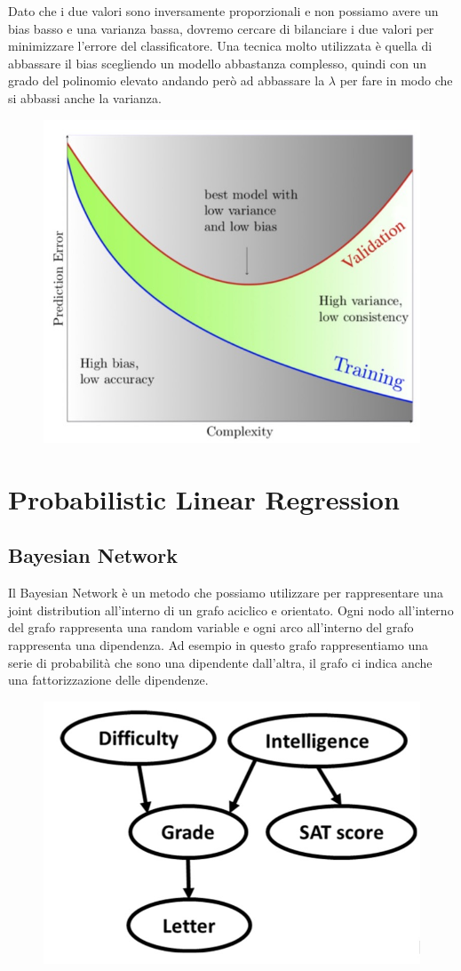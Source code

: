 \documentclass[14pt]{extreport}
\begin{document}
Dato che i due valori sono inversamente proporzionali e non possiamo avere un bias basso e una varianza bassa, dovremo cercare di bilanciare i due
valori per minimizzare l'errore del classificatore. Una tecnica molto utilizzata è quella di abbassare il bias scegliendo un modello abbastanza
complesso, quindi con un grado del polinomio elevato andando però ad abbassare la $\lambda$ per fare in modo che si abbassi anche la varianza.

\begin{figure}[H]
	\centering
	\includegraphics[width=0.7\linewidth]{94.jpeg}
\end{figure}


\section{Probabilistic Linear Regression}

\subsection{Bayesian Network}

Il Bayesian Network è un metodo che possiamo utilizzare per rappresentare una joint distribution all'interno di un grafo aciclico e orientato. Ogni
nodo all'interno del grafo rappresenta una random variable e ogni arco all'interno del grafo rappresenta una dipendenza. Ad esempio in questo grafo
rappresentiamo una serie di probabilità che sono una dipendente dall'altra, il grafo ci indica anche una fattorizzazione delle dipendenze.

\begin{figure}[H]
	\centering
	\includegraphics[width=0.4\linewidth]{98.jpeg}
\end{figure}
\end{document}
